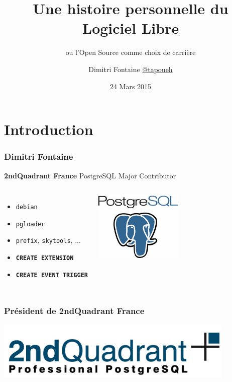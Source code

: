 \documentclass{beamer}
\title{Une histoire personnelle du Logiciel Libre}
\subtitle{ou l'Open Source comme choix de carrière}
\author{Dimitri Fontaine \linebreak \url{@tapoueh}}
\date{24 Mars 2015}o
\begin{document}
\frame{\titlepage}

\section{Introduction}

\begin{frame}[fragile]
  \frametitle{Dimitri Fontaine}

  \begin{center}
    \textbf{2ndQuadrant France}
    \linebreak
    PostgreSQL Major Contributor
  \end{center}
  \vfill

\begin{columns}[c]

  \begin{itemize}
   \item \texttt{debian}
   \item \texttt{pgloader}
   \item \texttt{prefix}, \texttt{skytools}, ...
   \item \texttt{\textbf{CREATE EXTENSION}}
   \item \texttt{\textbf{CREATE EVENT TRIGGER}}
  \end{itemize}  

\begin{center}
  \includegraphics[height=9em]{postgres-logo.png}
\end{center}
\end{columns}
\end{frame}

\begin{frame}
  \frametitle{Président de 2ndQuadrant France}

  \begin{center}
    \includegraphics[height=1.1in]{2ndquadrant_logo_full_color.jpg}
  \end{center}

  \vfill
\end{frame}
\end{document}
